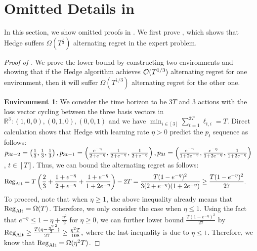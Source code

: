 \section{Omitted Details in }\label{app:lower_bound}
In this section, we show omitted proofs in . We first prove , which shows that Hedge suffers $\Omega(T^{\frac{1}{3}})$ alternating regret in the expert problem.
\begin{proof}[Proof of ]
We prove the lower bound by constructing two environments and showing that if the Hedge algorithm achieves $\mathcal{O}(T^{1/3})$ alternating regret for one environment, then it will suffer $\Omega(T^{1/3})$ alternating regret for the other one.

\textbf{Environment 1}: We consider the time horizon to be $3T$ and $3$ actions with the loss vector cycling between the three basis vectors in $\mathbb{R}^3: (1,0,0), (0,1,0), (0,0,1)$ and we have $\min_{i\in[3]} \sum_{t=1}^{3T} \ell_{t,i} = T$. Direct calculation shows that Hedge with learning rate $\eta>0$ predict the $p_t$ sequence as follows: $p_{3t-2}=\left(\frac{1}{3},\frac{1}{3},\frac{1}{3}\right), p_{3t-1}=\left(\frac{e^{-\eta}}{2+e^{-\eta}},\frac{1}{2+e^{-\eta}},\frac{1}{2+e^{-\eta}}\right), p_{3t}=\left(\frac{e^{-\eta}}{1+2e^{-\eta}},\frac{e^{-\eta}}{1+2e^{-\eta}},\frac{1}{1+2e^{-\eta}}\right)$, $t\in[T]$. Thus, we can bound the alternating regret as follows:
\begin{align*}
   & \mathrm{Reg}_{\mathrm{Alt}} = T\left(\frac{2}{3}+\frac{1+e^{-\eta}}{2+e^{-\eta}}+\frac{1+e^{-\eta}}{1+2e^{-\eta}}\right) - 2T= \frac{T(1-e^{-\eta})^2}{3(2+e^{-\eta})(1+2e^{-\eta})}\ge \frac{T(1-e^{-\eta})^2}{27}.
\end{align*}
To proceed, note that when $\eta \geq 1$, the above inequality already means that $\mathrm{Reg}_{\mathrm{Alt}}=\Omega(T)$. Therefore, we only consider the case when $\eta\leq 1$. Using the fact that $e^{-\eta} \le 1-\eta+\frac{\eta^2}{2}$ for $\eta\geq 0$, we can further lower bound $\frac{T(1-e^{-\eta})^2}{27}$ by $
    \mathrm{Reg}_{\mathrm{Alt}} \ge \frac{T(\eta-\frac{{\eta}^2}{2}^2)}{27}\ge \frac{\eta^2T}{108},$
where the last inequality is due to $\eta\leq 1$. Therefore, we know that $\mathrm{Reg}_{\mathrm{Alt}} = \Omega(\eta^2T)$.


\end{proof}
